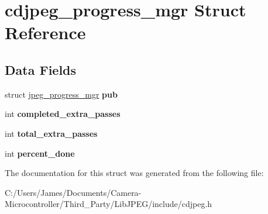 \hypertarget{structcdjpeg__progress__mgr}{}\section{cdjpeg\+\_\+progress\+\_\+mgr Struct Reference}
\label{structcdjpeg__progress__mgr}
\subsection*{Data Fields}
\begin{DoxyCompactItemize}
\item 
\mbox{\label{structcdjpeg__progress__mgr_a2133d94760d5ee62186aae2165bdbfc1}} 
struct \hyperlink{structjpeg__progress__mgr}{jpeg\+\_\+progress\+\_\+mgr} {\bfseries pub}
\item 
\mbox{\label{structcdjpeg__progress__mgr_a8cd56cdf9c09039925ea5eaf734c4eed}} 
int {\bfseries completed\+\_\+extra\+\_\+passes}
\item 
\mbox{\label{structcdjpeg__progress__mgr_a63ad15bcb4c492960a0ea93ac876d5fe}} 
int {\bfseries total\+\_\+extra\+\_\+passes}
\item 
\mbox{\label{structcdjpeg__progress__mgr_afc46e9052c4fd43b0c72f205280ade54}} 
int {\bfseries percent\+\_\+done}
\end{DoxyCompactItemize}


The documentation for this struct was generated from the following file\+:\begin{DoxyCompactItemize}
\item 
C\+:/\+Users/\+James/\+Documents/\+Camera-\/\+Microcontroller/\+Third\+\_\+\+Party/\+Lib\+J\+P\+E\+G/include/cdjpeg.\+h\end{DoxyCompactItemize}
